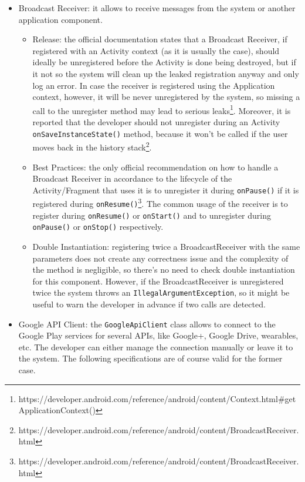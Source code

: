 \documentclass[11pt,a4paper,notitlepage]{article}
\begin{document}
\begin{itemize}
	\item Broadcast Receiver: it allows to receive messages from the system or another application component.
	\begin{itemize}
		\item Release: the official documentation states that a Broadcast Receiver, if registered with an Activity context (as it is usually the case), should ideally be unregistered before the Activity is done being destroyed, but if it not so the system will clean up the leaked registration anyway and only log an error. In case the receiver is registered using the Application context, however, it will be never unregistered by the system, so missing a call to the unregister method may lead to serious leaks\footnote{https://developer.android.com/reference/android/content/Context.html\#getApplicationContext()}. Moreover, it is reported that the developer should not unregister during an Activity \texttt{onSaveInstanceState()} method, because it won't be called if the user moves back in the history stack\footnote{https://developer.android.com/reference/android/content/BroadcastReceiver.html}.
		\item Best Practices: the only official recommendation on how to handle a Broadcast Receiver in accordance to the lifecycle of the Activity/Fragment that uses it is to unregister it during \texttt{onPause()} if it is registered during \texttt{onResume()}\footnote{https://developer.android.com/reference/android/content/BroadcastReceiver.html}. The common usage of the receiver is to register during \texttt{onResume()} or \texttt{onStart()} and to unregister during \texttt{onPause()} or \texttt{onStop()} respectively.
		\item Double Instantiation: registering twice a BroadcastReceiver with the same parameters does not create any correctness issue and the complexity of the method is negligible, so there's no need to check double instantiation for this component. However, if the BroadcastReceiver is unregistered twice the system throws an \texttt{IllegalArgumentException}, so it might be useful to warn the developer in advance if two calls are detected.
	\end{itemize}
	\item Google API Client: the \texttt{GoogleApiClient} class allows to connect to the Google Play services for several APIs, like Google+, Google Drive, wearables, etc. The developer can either manage the connection manually or leave it to the system. The following specifications are of course valid for the former case.

\end{itemize}
\end{document}
